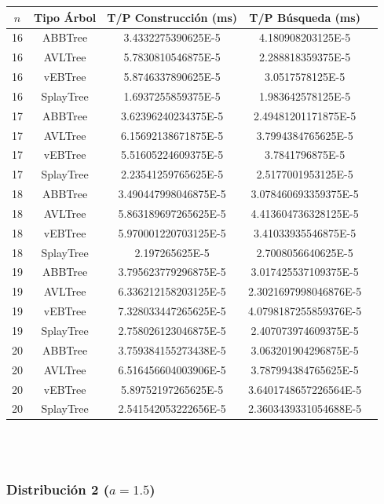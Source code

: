 \documentclass[letterpaper,12pt]{article}
\begin{document}
\begin{tabular}{|c|c|c|c|c|}
\hline
\textbf{$n$} & \textbf{Tipo Árbol} & \textbf{T/P Construcción (ms)} & \textbf{T/P Búsqueda (ms)} \\
\hline
16 & ABBTree & 3.4332275390625E-5 & 4.180908203125E-5 \\
\hline
16 & AVLTree & 5.7830810546875E-5  & 2.288818359375E-5 \\
\hline
16 & vEBTree & 5.8746337890625E-5  & 3.0517578125E-5 \\
\hline
16 & SplayTree & 1.6937255859375E-5 & 1.983642578125E-5 \\
\hline
\hline
17 & ABBTree & 3.62396240234375E-5  & 2.49481201171875E-5 \\
\hline
17 & AVLTree & 6.15692138671875E-5 & 3.7994384765625E-5 \\
\hline
17 & vEBTree & 5.51605224609375E-5  & 3.7841796875E-5\\
\hline
17 & SplayTree & 2.23541259765625E-5 & 2.5177001953125E-5 \\
\hline
\hline
18 & ABBTree & 3.490447998046875E-5 & 3.078460693359375E-5 \\
\hline
18 & AVLTree & 5.863189697265625E-5 & 4.413604736328125E-5 \\
\hline
18 & vEBTree & 5.970001220703125E-5 & 3.41033935546875E-5 \\
\hline
18 & SplayTree & 2.197265625E-5  & 2.7008056640625E-5 \\
\hline
\hline
19 & ABBTree & 3.795623779296875E-5 & 3.017425537109375E-5 \\
\hline
19 & AVLTree & 6.336212158203125E-5  & 2.3021697998046876E-5 \\
\hline
19 & vEBTree & 7.328033447265625E-5 & 4.0798187255859376E-5\\
\hline
19 & SplayTree & 2.758026123046875E-5 & 2.407073974609375E-5 \\
\hline
\hline
20 & ABBTree & 3.759384155273438E-5 & 3.063201904296875E-5 \\
\hline
20 & AVLTree & 6.516456604003906E-5 & 3.787994384765625E-5 \\
\hline
20 & vEBTree & 5.89752197265625E-5 & 3.6401748657226564E-5\\
\hline
20 & SplayTree & 2.541542053222656E-5 & 2.3603439331054688E-5 \\
\hline
\end{tabular}
\\ \\

\subsubsection{Distribución 2 ($a=1.5$)}
\end{document}
